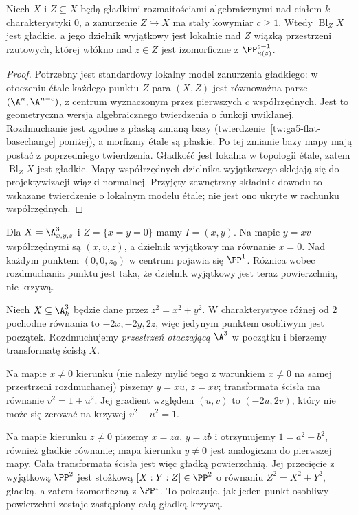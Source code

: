 \begin{wniosek}
\label{wn:ga5-smooth-center}
Niech $X$ i $Z\subseteq X$ będą gładkimi rozmaitościami
algebraicznymi nad ciałem $k$ charakterystyki $0$,
a zanurzenie $Z\hookrightarrow X$ ma stały kowymiar $c\ge1$.
Wtedy $\operatorname{Bl}_Z X$ jest gładkie, a jego
dzielnik wyjątkowy jest lokalnie nad $Z$ wiązką
przestrzeni rzutowych, której włókno nad $z\in Z$
jest izomorficzne z $\PP^{c-1}_{\kappa(z)}$.
\end{wniosek}
\begin{proof}
Potrzebny jest standardowy lokalny model zanurzenia
gładkiego: w otoczeniu étale każdego punktu $Z$
para $(X,Z)$ jest równoważna parze
$(\A^n,\A^{n-c})$, z centrum wyznaczonym przez
pierwszych $c$ współrzędnych. Jest to geometryczna
wersja algebraicznego twierdzenia o funkcji uwikłanej.
Rozdmuchanie jest zgodne z płaską zmianą bazy
(twierdzenie~\ref{tw:ga5-flat-basechange} poniżej),
a morfizmy étale są płaskie. Po tej zmianie bazy
mapy mają postać z poprzedniego twierdzenia.
Gładkość jest lokalna w topologii étale, zatem
$\operatorname{Bl}_Z X$ jest gładkie. Mapy współrzędnych dzielnika
wyjątkowego sklejają się do projektywizacji wiązki
normalnej. Przyjęty zewnętrzny składnik dowodu to
wskazane twierdzenie o lokalnym modelu étale;
nie jest ono ukryte w rachunku współrzędnych.
\end{proof}

\begin{przyklad}
Dla $X=\A^3_{x,y,z}$ i $Z=\{x=y=0\}$
mamy $I=(x,y)$. Na mapie $y=xv$ współrzędnymi
są $(x,v,z)$, a dzielnik wyjątkowy ma równanie
$x=0$. Nad każdym punktem $(0,0,z_0)$ w centrum
pojawia się $\PP^1$. Różnica wobec rozdmuchania
punktu jest taka, że dzielnik wyjątkowy jest teraz
powierzchnią, nie krzywą.
\end{przyklad}

\begin{przyklad}
\label{prz:ga5-cone}
Niech $X\subseteq\A^3_k$ będzie dane przez
$z^2=x^2+y^2$. W charakterystyce różnej od $2$
pochodne równania to $-2x,-2y,2z$, więc jedynym
punktem osobliwym jest początek. Rozdmuchujemy
\emph{przestrzeń otaczającą} $\A^3$ w początku
i bierzemy transformatę ścisłą $X$.

Na mapie $x\ne0$ kierunku (nie należy mylić tego
z warunkiem $x\ne0$ na samej przestrzeni rozdmuchanej)
piszemy $y=xu$, $z=xv$; transformata ścisła ma
równanie $v^2=1+u^2$. Jej gradient względem
$(u,v)$ to $(-2u,2v)$, który nie może się zerować
na krzywej $v^2-u^2=1$.

Na mapie kierunku $z\ne0$ piszemy
$x=za$, $y=zb$ i otrzymujemy $1=a^2+b^2$,
również gładkie równanie; mapa kierunku $y\ne0$
jest analogiczna do pierwszej mapy. Cała transformata
ścisła jest więc gładką powierzchnią.
Jej przecięcie z wyjątkową $\PP^2$ jest stożkową
$[X:Y:Z]\in\PP^2$ o równaniu $Z^2=X^2+Y^2$,
gładką, a zatem izomorficzną z $\PP^1$.
To pokazuje, jak jeden punkt osobliwy powierzchni
zostaje zastąpiony całą gładką krzywą.
\end{przyklad}

